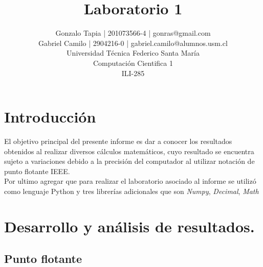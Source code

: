 \documentclass[a4paper,11pt]{article}
\title{Laboratorio 1}
\author{Gonzalo Tapia | 201073566-4 | gonras@gmail.com\\Gabriel Camilo | 2904216-0 | gabriel.camilo@alumnos.usm.cl\\ Universidad Técnica Federico Santa María \\
Computación Cientifica 1\\ILI-285}
\begin{document}
\maketitle 

\newpage

\section{Introducción}

El objetivo principal del presente informe es dar a conocer los resultados obtenidos al realizar diversos cálculos matemáticos, cuyo resultado se encuentra sujeto a variaciones debido a la precisión del computador al utilizar notación de punto flotante IEEE.\\
Por ultimo agregar que para realizar el laboratorio asociado al informe se utilizó como lenguaje Python y tres librerías adicionales que son \textit{Numpy}, \textit{Decimal}, \textit{Math}

\section{Desarrollo y análisis de resultados.}
\subsection{Punto flotante}
\end{document}

